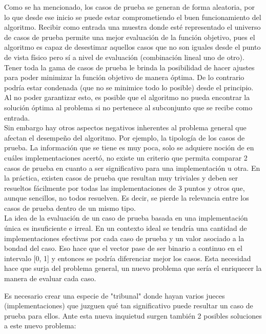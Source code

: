 \documentclass[a4paper,12pt]{book}
\begin{document}
	Como se ha mencionado, los casos de prueba se generan de forma aleatoria, por lo que desde ese inicio se puede estar comprometiendo el buen funcionamiento del algoritmo. Recibir como entrada una muestra donde esté representado el universo de casos de prueba permite una mejor evaluación de la función objetivo, pues el algoritmo es capaz de desestimar aquellos casos que no son iguales desde el punto de vista físico pero sí a nivel de evaluación (combinación lineal uno de otro). Tener toda la gama de casos de prueba le brinda la posibilidad de hacer ajustes para poder minimizar la función objetivo de manera óptima. De lo contrario podría estar condenada (que no se minimice todo lo posible) desde el principio. Al no poder garantizar esto, es posible que el algoritmo no pueda encontrar la solución óptima al problema si no pertenece al subconjunto que se recibe como entrada. \\
	
	Sin embargo hay otros aspectos negativos inherentes al problema general que afectan el desempeño del algoritmo. Por ejemplo, la tipología de los casos de prueba. La información que se tiene es muy poca, solo se adquiere noción de en cuáles implementaciones acertó, no existe un criterio que permita comparar 2 casos de prueba en cuanto a ser significativo para una implementación u otra. En la práctica, existen casos de prueba que resultan muy triviales y deben ser resueltos fácilmente por todas las implementaciones de 3 puntos y otros que, aunque sencillos, no todos resuelven. Es decir, se pierde la relevancia entre los casos de prueba dentro de un mismo tipo. \\
	
	La idea de la evaluación de un caso de prueba basada en una implementación única es insuficiente e irreal. En un contexto ideal se tendría una cantidad de implementaciones efectivas por cada caso de prueba y un valor asociado a la bondad del caso. Eso hace que el vector pase de ser binario a continuo en el intervalo [0, 1] y entonces se podría diferenciar mejor los casos. Esta necesidad hace que surja del problema general, un nuevo problema que sería el enriquecer la manera de evaluar cada caso.
	
	Es necesario crear una especie de "tribunal" donde hayan varios jueces (implementaciones) que juzguen qué tan significativo puede resultar un caso de prueba para ellos. Ante esta nueva inquietud surgen también 2 posibles soluciones a este nuevo problema: \\
	
\end{document}
